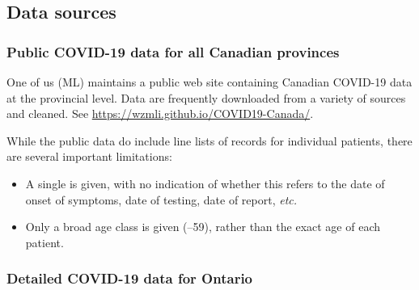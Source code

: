 \documentclass[12pt]{article}\usepackage[]{graphicx}\usepackage[]{color}
\begin{document}
\subsection{Data sources}


\subsubsection*{Public COVID-19 data for all Canadian provinces}

One of us (ML) maintains a public web site containing Canadian
COVID-19 data at the provincial level.  Data are frequently downloaded
from a variety of sources and cleaned.  See
\url{https://wzmli.github.io/COVID19-Canada/}.

While the public data do include line lists of records for individual
patients, there are several important limitations: 
\begin{itemize}
\item A single  is given, with no indication of
  whether this refers to the date of onset of symptoms, date of
  testing, date of report, \emph{etc.}
\item Only a broad age class is given (--59), rather than the
  exact age of each patient.
\end{itemize}

\subsubsection*{Detailed COVID-19 data for Ontario}
\end{document}
